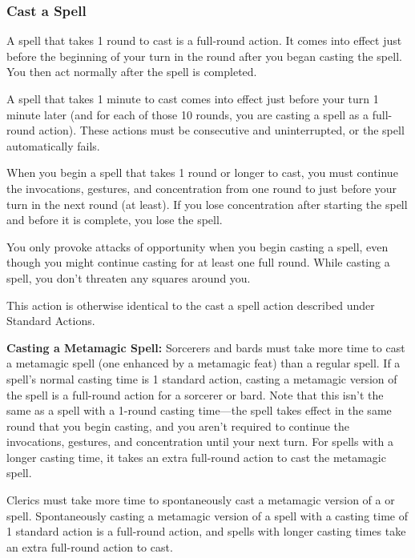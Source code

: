 \subsubsection{Cast a Spell}
A spell that takes 1 round to cast is a full-round action. It comes into effect just before the beginning of your turn in the round after you began casting the spell. You then act normally after the spell is completed.

A spell that takes 1 minute to cast comes into effect just before your turn 1 minute later (and for each of those 10 rounds, you are casting a spell as a full-round action). These actions must be consecutive and uninterrupted, or the spell automatically fails.

When you begin a spell that takes 1 round or longer to cast, you must continue the invocations, gestures, and concentration from one round to just before your turn in the next round (at least). If you lose concentration after starting the spell and before it is complete, you lose the spell.

You only provoke attacks of opportunity when you begin casting a spell, even though you might continue casting for at least one full round. While casting a spell, you don't threaten any squares around you.

This action is otherwise identical to the cast a spell action described under Standard Actions.

\textbf{Casting a Metamagic Spell:} Sorcerers and bards must take more time to cast a metamagic spell (one enhanced by a metamagic feat) than a regular spell. If a spell's normal casting time is 1 standard action, casting a metamagic version of the spell is a full-round action for a sorcerer or bard. Note that this isn't the same as a spell with a 1-round casting time---the spell takes effect in the same round that you begin casting, and you aren't required to continue the invocations, gestures, and concentration until your next turn. For spells with a longer casting time, it takes an extra full-round action to cast the metamagic spell.

Clerics must take more time to spontaneously cast a metamagic version of a  or  spell. Spontaneously casting a metamagic version of a spell with a casting time of 1 standard action is a full-round action, and spells with longer casting times take an extra full-round action to cast.
